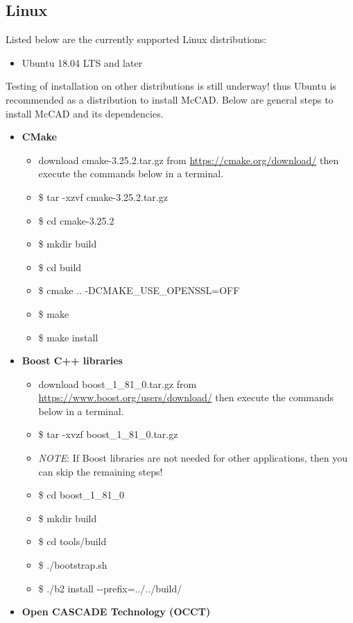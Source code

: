 \documentclass[12pt, a4paper, titlepage]{article}
\begin{document}
  \subsection{Linux}
    Listed below are the currently supported Linux distributions:
    \begin{itemize}
  	  \item Ubuntu 18.04 LTS and later
    \end{itemize} 
    Testing of installation on other distributions is still underway! thus Ubuntu is recommended as a distribution to install McCAD. Below are general steps to install McCAD and its dependencies.
    \begin{itemize}
  	  \item \textbf{CMake}
  	  \begin{itemize}
		\item download cmake-3.25.2.tar.gz from \url{https://cmake.org/download/} then execute the commands below in a terminal.
		\item \$ tar -xzvf cmake-3.25.2.tar.gz
		\item \$ cd cmake-3.25.2
		\item \$ mkdir build
		\item \$ cd build
		\item \$ cmake .. -DCMAKE\_USE\_OPENSSL=OFF
		\item \$ make
		\item \$ make install
  	  \end{itemize}
      \item \textbf{Boost C++ libraries}
      \begin{itemize}
    	\item download boost\_1\_81\_0.tar.gz from \url{https://www.boost.org/users/download/} then execute the commands below in a terminal.
    	\item \$ tar -xvzf boost\_1\_81\_0.tar.gz
    	\item \emph{NOTE}: If Boost libraries are not needed for other applications, then you can skip the remaining steps!
    	\item \$ cd boost\_1\_81\_0
    	\item \$ mkdir build
    	\item \$ cd tools/build
    	\item \$ ./bootstrap.sh
    	\item \$ ./b2 install -\--prefix=../../build/
      \end{itemize}
      \item \textbf{Open CASCADE Technology (OCCT)}

\end{itemize}
\end{document}
